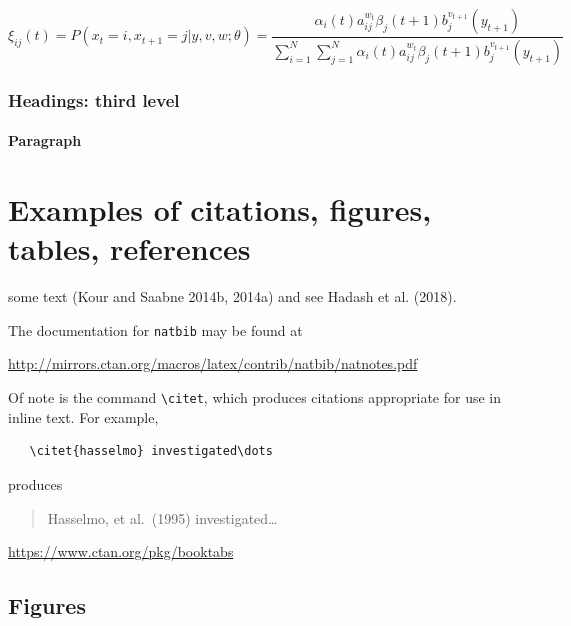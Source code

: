 \documentclass{article}
\begin{document}
\lipsum[5]

\[
\xi _{ij}(t)=P(x_{t}=i,x_{t+1}=j|y,v,w;\theta)= {\frac {\alpha _{i}(t)a^{w_t}_{ij}\beta _{j}(t+1)b^{v_{t+1}}_{j}(y_{t+1})}{\sum _{i=1}^{N} \sum _{j=1}^{N} \alpha _{i}(t)a^{w_t}_{ij}\beta _{j}(t+1)b^{v_{t+1}}_{j}(y_{t+1})}}
\]

\hypertarget{headings-third-level}{%
\subsubsection{Headings: third level}\label{headings-third-level}}

\lipsum[6]

\paragraph{Paragraph}
\lipsum[7]

\hypertarget{examples-of-citations-figures-tables-references}{%
\section{Examples of citations, figures, tables,
references}\label{examples-of-citations-figures-tables-references}}

\label{sec:others}

\lipsum[8] some text (Kour and Saabne 2014b, 2014a) and see Hadash et
al. (2018).

The documentation for \verb+natbib+ may be found at

\begin{center}
  \url{http://mirrors.ctan.org/macros/latex/contrib/natbib/natnotes.pdf}
\end{center}

Of note is the command \verb+\citet+, which produces citations
appropriate for use in inline text. For example,

\begin{verbatim}
   \citet{hasselmo} investigated\dots
\end{verbatim}

produces

\begin{quote}
  Hasselmo, et al.\ (1995) investigated\dots
\end{quote}

\begin{center}
  \url{https://www.ctan.org/pkg/booktabs}
\end{center}

\hypertarget{figures}{%
\subsection{Figures}\label{figures}}
\end{document}
